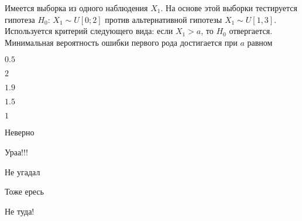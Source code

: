 
\begin{question}
Имеется выборка из одного наблюдения \(X_1\). На основе этой выборки
тестируется гипотеза \(H_0\): \(X_1 \sim U[0;2]\) против альтернативной
гипотезы \(X_1 \sim U[1,3]\). Используется критерий следующего вида:
если \(X_1>a\), то \(H_0\) отвергается. Минимальная вероятность ошибки
первого рода достигается при \(a\) равном
\begin{answerlist}
  \item \(0.5\)
  \item \(2\)
  \item \(1.9\)
  \item \(1.5\)
  \item \(1\)
\end{answerlist}
\end{question}

\begin{solution}
\begin{answerlist}
  \item Неверно
  \item Ураа!!!
  \item Не угадал
  \item Тоже ересь
  \item Не туда!
\end{answerlist}
\end{solution}

